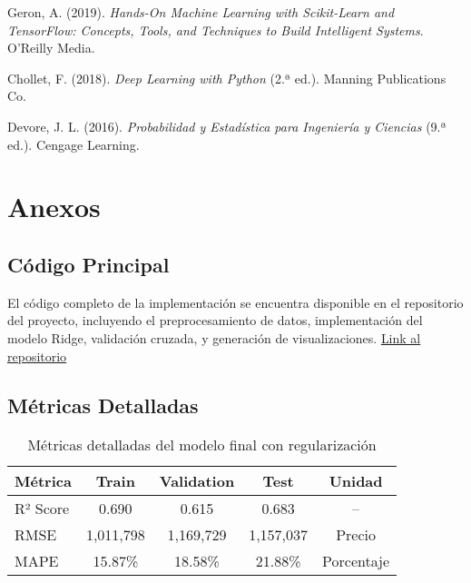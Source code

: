\documentclass[11pt,a4paper]{article}
\begin{document}
\begin{thebibliography}{9}

    Geron, A. (2019). \textit{Hands-On Machine Learning with Scikit-Learn and TensorFlow: Concepts, Tools, and Techniques to Build Intelligent Systems}. O'Reilly Media.

    Chollet, F. (2018). \textit{Deep Learning with Python} (2.ª ed.). Manning Publications Co.
    
    Devore, J. L. (2016). \textit{Probabilidad y Estadística para Ingeniería y Ciencias} (9.ª ed.). Cengage Learning.


\end{thebibliography}

\section{Anexos}

\subsection{Código Principal}
El código completo de la implementación se encuentra disponible en el repositorio del proyecto, incluyendo el preprocesamiento de datos, implementación del modelo Ridge, validación cruzada, y generación de visualizaciones. \href{https://github.com/DiegoAlfaro1/Portafolio-Implementacion-TC3006}{Link al repositorio}

\subsection{Métricas Detalladas}

\begin{table}[H]
    \centering
    \begin{tabular}{|l|c|c|c|c|}
    \hline
    \textbf{Métrica} & \textbf{Train} & \textbf{Validation} & \textbf{Test} & \textbf{Unidad} \\
    \hline
    R² Score & 0.690 & 0.615 & 0.683 & -- \\
    RMSE & 1,011,798 & 1,169,729 & 1,157,037 & Precio \\
    MAPE & 15.87\% & 18.58\% & 21.88\% & Porcentaje \\
    \hline
    \end{tabular}
    \caption{Métricas detalladas del modelo final con regularización}
    \label{tab:detailed_metrics}
\end{table}
\end{document}

